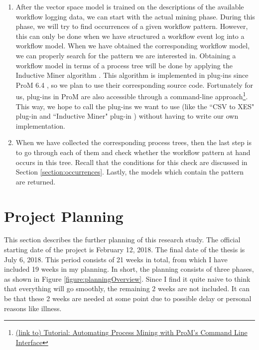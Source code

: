 \documentclass[a4paper,11pt]{article}
\begin{document}
\begin{enumerate}
For the application of Word2Vec, we have multiple options. Java also supports the use of word2vec models. An option is to use DeepLearningJ \footnote{https://deeplearning4j.org/word2vec}, which is a library in Java and an implementation of word2vec. Alternatives are Gensim\footnote{https://radimrehurek.com/gensim/} (a python library) and Google's word2vec tool\footnote{https://code.google.com/archive/p/word2vec/}. 
\item After the vector space model is trained on the descriptions of the available workflow logging data, we can start with the actual mining phase. During this phase, we will try to find occurrences of a given workflow pattern. However, this can only be done when we have structured a workflow event log into a workflow model. When we have obtained the corresponding workflow model, we can properly search for the pattern we are interested in. Obtaining a workflow model in terms of a process tree will be done by applying the Inductive Miner algorithm \cite{InductiveMiner2013}. This algorithm is implemented in plug-ins since ProM 6.4 \cite{InductiveVisualMiner2014}, so we plan to use their corresponding source code. Fortunately for us, plug-ins in ProM are also accessible through a command-line approach\footnote{\href{https://dirksmetric.wordpress.com/2015/03/11/tutorial-automating-process-mining-with-proms-command-line-interface/}{(link to) Tutorial: Automating Process Mining with ProM’s Command Line Interface}}. This way, we hope to call the plug-ins we want to use (like the ``CSV to XES" plug-in \cite{XES2011Verbeek} and ``Inductive Miner" plug-in \cite{InductiveMiner2013}) without having to write our own implementation.
\item When we have collected the corresponding process trees, then the last step is to go through each of them and check whether the workflow pattern at hand occurs in this tree. Recall that the conditions for this check are discussed in Section \ref{section:occurrences}. Lastly, the models which contain the pattern are returned. 
\end{enumerate}

\section{Project Planning}
\label{section:planning}
This section describes the further planning of this research study. The official starting date of the project is February 12, 2018. The final date of the thesis is July 6, 2018. This period consists of 21 weeks in total, from which I have included 19 weeks in my planning. In short, the planning consists of three phases, as shown in Figure \ref{figure:planningOverview}. Since I find it quite naive to think that everything will go smoothly, the remaining 2 weeks are not included. It can be that these 2 weeks are needed at some point due to possible delay or personal reasons like illness.
\end{document}
